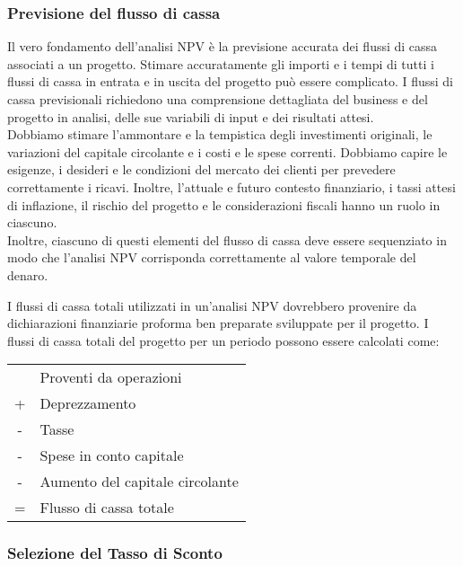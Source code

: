 \documentclass[a4paper,portrait,12pt]{article}
\theoremstyle{definition}
\begin{document}
\subsubsection{Previsione del flusso di cassa}

Il vero fondamento dell'analisi NPV è la previsione accurata dei flussi di cassa associati a un progetto.
Stimare accuratamente gli importi e i tempi di tutti i flussi di cassa in entrata e in uscita del progetto può essere complicato.
I flussi di cassa previsionali richiedono una comprensione dettagliata del business e del progetto in analisi, delle sue variabili di input e dei risultati attesi.\\

Dobbiamo stimare l'ammontare e la tempistica degli investimenti originali, le variazioni del capitale circolante e i costi e le spese correnti.
Dobbiamo capire le esigenze, i desideri e le condizioni del mercato dei clienti per prevedere correttamente i ricavi.
Inoltre, l'attuale e futuro contesto finanziario, i tassi attesi di inflazione, il rischio del progetto e le considerazioni fiscali hanno un ruolo in ciascuno.\\

Inoltre, ciascuno di questi elementi del flusso di cassa deve essere sequenziato in modo che l'analisi NPV corrisponda correttamente al valore temporale del denaro.

I flussi di cassa totali utilizzati in un'analisi NPV dovrebbero provenire da dichiarazioni finanziarie proforma ben preparate sviluppate per il progetto.
I flussi di cassa totali del progetto per un periodo possono essere calcolati come:

\begin{table}[H]
\begin{center}
\begin{tabular}{cl}
& Proventi da operazioni\\
+ & Deprezzamento\\
- & Tasse\\
- & Spese in conto capitale\\
- & Aumento del capitale circolante\\
= & Flusso di cassa totale\\
\end{tabular}
\end{center}
\end{table}

\subsubsection{Selezione del Tasso di Sconto}
\end{document}
